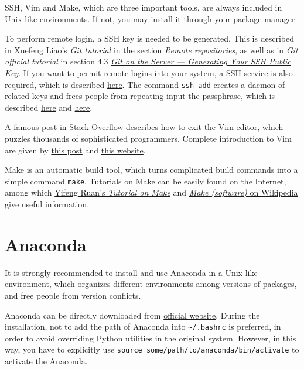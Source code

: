 \documentclass[english]{../TeXTemplate/pkupaper}
\begin{document}
SSH, Vim and Make, which are three important tools, are always included in Unix-like environments. If not, you may install it through your package manager.

To perform remote login, a SSH key is needed to be generated. This is described in Xuefeng Liao's \emph{Git tutorial} in the section \href{https://www.liaoxuefeng.com/wiki/0013739516305929606dd18361248578c67b8067c8c017b000/001374385852170d9c7adf13c30429b9660d0eb689dd43a000}{\emph{Remote repositories}}, as well as in \emph{Git official tutorial} in section 4.3 \href{https://git-scm.com/book/en/v2/Git-on-the-Server-Generating-Your-SSH-Public-Key}{\emph{Git on the Server --- Generating Your SSH Public Key}}. If you want to permit remote logins into your system, a SSH service is also required, which is described \href{http://www.linuxidc.com/Linux/2010-02/24349.htm}{here}. The command \verb"ssh-add" creates a daemon of related keys and frees people from repeating input the passphrase, which is described \href{http://blog.csdn.net/vizts/article/details/47043695}{here} and \href{https://www.cnblogs.com/kex1n/p/5229493.html}{here}.

A famous \href{https://stackoverflow.com/questions/11828270/how-to-exit-the-vim-editor}{post} in Stack Overflow describes how to exit the Vim editor, which puzzles thousands of sophisticated programmers. Complete introduction to Vim are given by \href{http://www.jianshu.com/p/bcbe916f97e1}{this post} and \href{https://blog.interlinked.org/tutorials/vim_tutorial.html}{this website}.

Make is an automatic build tool, which turns complicated build commands into a simple command \verb"make". Tutorials on Make can be easily found on the Internet, among which \href{http://www.ruanyifeng.com/blog/2015/02/make.html}{Yifeng Ruan's \emph{Tutorial on Make}} and \href{https://en.wikipedia.org/wiki/Make_(software)}{\emph{Make (software)} on Wikipedia} give useful information.

\section{Anaconda}

It is strongly recommended to install and use Anaconda in a Unix-like environment, which organizes different environments among versions of packages, and free people from version conflicts.

Anaconda can be directly downloaded from \href{https://www.anaconda.com/download/}{official website}. During the installation, not to add the path of Anaconda into \verb"~/.bashrc" is preferred, in order to avoid overriding Python utilities in the original system. However, in this way, you have to explicitly use \verb"source some/path/to/anaconda/bin/activate" to activate the Anaconda.
\end{document}
